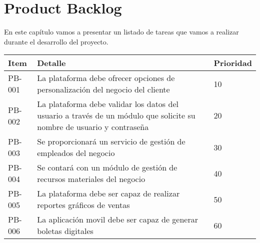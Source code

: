\chapter{Product Backlog}

En este capítulo vamos a presentar un listado de tareas que vamos a realizar durante el desarrollo del proyecto.

\begin{table}[htbp]
	\begin{center}
		\begin{tabular}{|p{1.5cm} | p{12cm} | p{2cm} |}
			\hline
			Item & Detalle & Prioridad  \\
			\hline
			PB-001 & La plataforma debe ofrecer opciones de personalización del negocio del cliente & 10  \\
			\hline
			PB-002 & La plataforma debe validar los datos del usuario a través de un módulo que solicite su nombre de usuario y contraseña & 20 \\
			\hline
			PB-003 & Se proporcionará un servicio de gestión de empleados del negocio & 30  \\
			\hline
			PB-004 & Se contará con un módulo de gestión de recursos materiales del negocio & 40 \\
			\hline	
			PB-005 & La plataforma debe ser capaz de realizar reportes gráficos de ventas & 50 \\
			\hline
			PB-006 & La aplicación movil debe ser capaz de generar boletas digitales & 60 \\
			\hline
		\end{tabular}
	\end{center}
\end{table}
